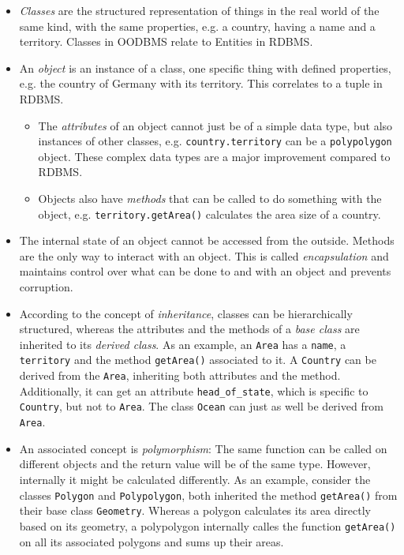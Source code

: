\begin{itemize}
  \item \emph{Classes} are the structured representation of things in the real world of the same kind, with the same properties, e.g. a country, having a name and a territory. Classes in OODBMS relate to Entities in RDBMS.
  \item An \emph{object} is an instance of a class, one specific thing with defined properties, e.g. the country of Germany with its territory. This correlates to a tuple in RDBMS.
  \begin{itemize}
    \item The \emph{attributes} of an object cannot just be of a simple data type, but also instances of other classes, e.g. \texttt{country.territory} can be a \texttt{polypolygon} object. These complex data types are a major improvement compared to RDBMS.
    \item Objects also have \emph{methods} that can be called to do something with the object, e.g. \texttt{territory.getArea()} calculates the area size of a country.
  \end{itemize}
  \item The internal state of an object cannot be accessed from the outside. Methods are the only way to interact with an object. This is called \emph{encapsulation} and maintains control over what can be done to and with an object and prevents corruption.
  \item According to the concept of \emph{inheritance}, classes can be hierarchically structured, whereas the attributes and the methods of a \emph{base class} are inherited to its \emph{derived class}. As an example, an \texttt{Area} has a \texttt{name}, a \texttt{territory} and the method \texttt{getArea()} associated to it. A \texttt{Country} can be derived from the \texttt{Area}, inheriting both attributes and the method. Additionally, it can get an attribute \texttt{head\_of\_state}, which is specific to \texttt{Country}, but not to \texttt{Area}. The class \texttt{Ocean} can just as well be derived from \texttt{Area}.
  \item An associated concept is \emph{polymorphism}: The same function can be called on different objects and the return value will be of the same type. However, internally it might be calculated differently. As an example, consider the classes \texttt{Polygon} and \texttt{Polypolygon}, both inherited the method \texttt{getArea()} from their base class \texttt{Geometry}. Whereas a polygon calculates its area directly based on its geometry, a polypolygon internally calles the function \texttt{getArea()} on all its associated polygons and sums up their areas.
\end{itemize}

